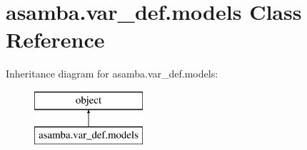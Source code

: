\hypertarget{classasamba_1_1var__def_1_1models}{}\section{asamba.\+var\+\_\+def.\+models Class Reference}
\label{classasamba_1_1var__def_1_1models}
Inheritance diagram for asamba.\+var\+\_\+def.\+models\+:\begin{figure}[H]
\begin{center}
\leavevmode
\includegraphics[height=2.000000cm]{classasamba_1_1var__def_1_1models}
\end{center}
\end{figure}
